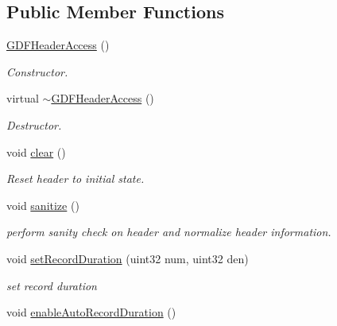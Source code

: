 \subsection*{Public Member Functions}
\begin{DoxyCompactItemize}
\item 
\hypertarget{classgdf_1_1_g_d_f_header_access_a12a8c246928d4f20a50ac6dea24e692f}{
\hyperlink{classgdf_1_1_g_d_f_header_access_a12a8c246928d4f20a50ac6dea24e692f}{GDFHeaderAccess} ()}
\label{classgdf_1_1_g_d_f_header_access_a12a8c246928d4f20a50ac6dea24e692f}

\begin{DoxyCompactList}\small\item\em Constructor. \item\end{DoxyCompactList}\item 
\hypertarget{classgdf_1_1_g_d_f_header_access_af05da736e9d7c18f9799c163fd595d3d}{
virtual \hyperlink{classgdf_1_1_g_d_f_header_access_af05da736e9d7c18f9799c163fd595d3d}{$\sim$GDFHeaderAccess} ()}
\label{classgdf_1_1_g_d_f_header_access_af05da736e9d7c18f9799c163fd595d3d}

\begin{DoxyCompactList}\small\item\em Destructor. \item\end{DoxyCompactList}\item 
\hypertarget{classgdf_1_1_g_d_f_header_access_abcc7802343db18a8c33d9a3c0bb26b43}{
void \hyperlink{classgdf_1_1_g_d_f_header_access_abcc7802343db18a8c33d9a3c0bb26b43}{clear} ()}
\label{classgdf_1_1_g_d_f_header_access_abcc7802343db18a8c33d9a3c0bb26b43}

\begin{DoxyCompactList}\small\item\em Reset header to initial state. \item\end{DoxyCompactList}\item 
void \hyperlink{classgdf_1_1_g_d_f_header_access_a16f91d1cb964f0acd3c842cf87c9d959}{sanitize} ()
\begin{DoxyCompactList}\small\item\em perform sanity check on header and normalize header information. \item\end{DoxyCompactList}\item 
void \hyperlink{classgdf_1_1_g_d_f_header_access_a116bd9d2057604f6894dae69ebb650ec}{setRecordDuration} (uint32 num, uint32 den)
\begin{DoxyCompactList}\small\item\em set record duration \item\end{DoxyCompactList}\item 
\hypertarget{classgdf_1_1_g_d_f_header_access_ad239f32a736961911c214130d1ba27fb}{
void \hyperlink{classgdf_1_1_g_d_f_header_access_ad239f32a736961911c214130d1ba27fb}{enableAutoRecordDuration} ()}
\label{classgdf_1_1_g_d_f_header_access_ad239f32a736961911c214130d1ba27fb}


\end{DoxyCompactItemize}
